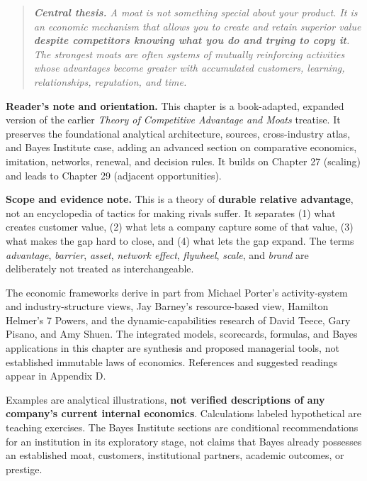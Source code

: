
\begin{quote}
\textit{\textbf{Central thesis.} A moat is not something special about your product. It is an economic mechanism that allows you to create and retain superior value \textbf{despite competitors knowing what you do and trying to copy it}. The strongest moats are often systems of mutually reinforcing activities whose advantages become greater with accumulated customers, learning, relationships, reputation, and time.}
\end{quote}

\noindent\textbf{Reader's note and orientation.} This chapter is a book-adapted, expanded version of the earlier \textit{Theory of Competitive Advantage and Moats} treatise. It preserves the foundational analytical architecture, sources, cross-industry atlas, and Bayes Institute case, adding an advanced section on comparative economics, imitation, networks, renewal, and decision rules. It builds on Chapter 27 (scaling) and leads to Chapter 29 (adjacent opportunities).

\vspace{0.5em}
\noindent\textbf{Scope and evidence note.} This is a theory of \textbf{durable relative advantage}, not an encyclopedia of tactics for making rivals suffer. It separates (1) what creates customer value, (2) what lets a company capture some of that value, (3) what makes the gap hard to close, and (4) what lets the gap expand. The terms \textit{advantage}, \textit{barrier}, \textit{asset}, \textit{network effect}, \textit{flywheel}, \textit{scale}, and \textit{brand} are deliberately not treated as interchangeable.

The economic frameworks derive in part from Michael Porter's activity-system and industry-structure views, Jay Barney's resource-based view, Hamilton Helmer's 7 Powers, and the dynamic-capabilities research of David Teece, Gary Pisano, and Amy Shuen. The integrated models, scorecards, formulas, and Bayes applications in this chapter are synthesis and proposed managerial tools, not established immutable laws of economics. References and suggested readings appear in Appendix D.

Examples are analytical illustrations, \textbf{not verified descriptions of any company's current internal economics}. Calculations labeled hypothetical are teaching exercises. The Bayes Institute sections are conditional recommendations for an institution in its exploratory stage, not claims that Bayes already possesses an established moat, customers, institutional partners, academic outcomes, or prestige.

